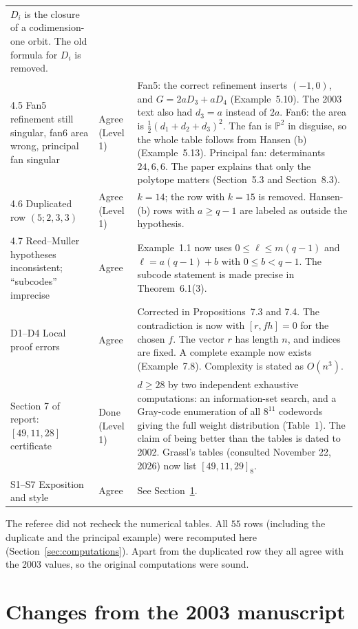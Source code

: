 \documentclass[12pt,letterpaper]{article}
\newcommand{\PP}{\mathbb{P}}
\begin{document}
\begin{longtable}{@{}L{0.27\textwidth}L{0.19\textwidth}L{0.46\textwidth}@{}}
$D_i$ is the closure of a codimension-one orbit. The old formula for $D_i$ is
removed.\\
4.5 Fan5 refinement still singular, fan6 area wrong, principal fan singular
& Agree (Level 1) & Fan5: the correct refinement inserts $(-1,0)$, and
$G=2aD_3+aD_4$ (Example~5.10). The 2003 text also had $d_3=a$ instead of $2a$.
Fan6: the area is $\tfrac12(d_1+d_2+d_3)^2$. The fan is $\PP^2$ in disguise,
so the whole table follows from Hansen (b) (Example~5.13). Principal fan:
determinants $24,6,6$. The paper explains that only the polytope matters
(Section~5.3 and Section~8.3).\\
4.6 Duplicated row $(5;2,3,3)$ & Agree (Level 1) & $k=14$; the row with
$k=15$ is removed. Hansen-(b) rows with $a\ge q-1$ are labeled as outside the
hypothesis.\\
4.7 Reed--Muller hypotheses inconsistent; ``subcodes'' imprecise & Agree &
Example~1.1 now uses $0\le\ell\le m(q-1)$ and $\ell=a(q-1)+b$ with $0\le
b<q-1$. The subcode statement is made precise in Theorem~6.1(3).\\
D1--D4 Local proof errors & Agree & Corrected in Propositions~7.3 and 7.4. The
contradiction is now with $[r,fh]=0$ for the chosen $f$. The vector $r$ has
length $n$, and indices are fixed. A complete example now exists
(Example~7.8). Complexity is stated as $O(n^3)$.\\
Section 7 of report: $[49,11,28]$ certificate & Done (Level 1) & $d\ge28$ by two independent
exhaustive computations: an information-set search, and a Gray-code
enumeration of all $8^{11}$ codewords giving the full weight distribution
(Table~1). The claim of being better than the tables is dated to 2002. Grassl's
tables (consulted November 22, 2026) now list $[49,11,29]_8$.\\
S1--S7 Exposition and style & Agree & See Section~\ref{sec:changes}.\\
\bottomrule
\end{longtable}

The referee did not recheck the numerical tables. All $55$ rows (including the duplicate and the principal example) were
recomputed here (Section~\ref{sec:computations}). Apart from the duplicated
row they all agree with the 2003 values, so the original computations were
sound.

\section{Changes from the 2003 manuscript}\label{sec:changes}
\end{document}
